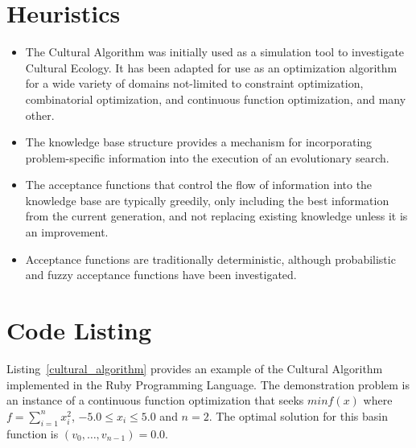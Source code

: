 \documentclass[a4paper, 11pt]{article}
\begin{document}
\section{Heuristics}
\label{sec:heuristics}
\begin{itemize}
	\item The Cultural Algorithm was initially used as a simulation tool to investigate Cultural Ecology. It has been adapted for use as an optimization algorithm for a wide variety of domains not-limited to constraint optimization, combinatorial optimization, and continuous function optimization, and many other.
	\item The knowledge base structure provides a mechanism for incorporating problem-specific information into the execution of an evolutionary search.
	\item The acceptance functions that control the flow of information into the knowledge base are typically greedily, only including the best information from the current generation, and not replacing existing knowledge unless it is an improvement.
	\item Acceptance functions are traditionally deterministic, although probabilistic and fuzzy acceptance functions have been investigated.
\end{itemize}

\section{Code Listing}
\label{sec:code}
Listing~\ref{cultural_algorithm} provides an example of the Cultural Algorithm implemented in the Ruby Programming Language. 
The demonstration problem is an instance of a continuous function optimization that seeks $min f(x)$ where $f=\sum_{i=1}^n x_{i}^2$, $-5.0\leq x_i \leq 5.0$ and $n=2$. The optimal solution for this basin function is $(v_0,\ldots,v_{n-1})=0.0$.
\end{document}
